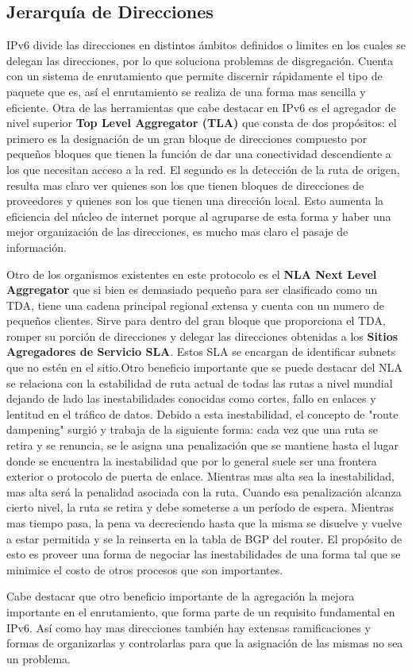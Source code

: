 \documentclass[11pt,a4paper]{article}
\begin{document}
\subsection{Jerarquía de Direcciones}
IPv6 divide las direcciones en distintos ámbitos definidos o limites en los cuales se delegan las 
direcciones, por lo que soluciona problemas de disgregación. Cuenta con un sistema de enrutamiento 
que permite discernir rápidamente el tipo de paquete que es, así el enrutamiento se realiza de una 
forma mas sencilla y eficiente.
Otra de las herramientas que cabe destacar en IPv6 es el agregador de nivel superior \textbf{Top 
Level Aggregator (TLA)} que consta de dos propósitos: el primero es la designación de un gran bloque 
de direcciones compuesto por pequeños bloques que tienen la función de dar una conectividad 
descendiente a los que necesitan acceso a la red. El segundo es la detección de la ruta de origen, 
resulta mas claro ver quienes son los que tienen bloques de direcciones de proveedores y quienes son 
los que tienen una dirección local. Esto aumenta la eficiencia del núcleo de internet porque al 
agruparse de esta forma y haber una mejor organización de las direcciones, es mucho mas claro el 
pasaje de información.\par
Otro de los organismos existentes en este protocolo es el \textbf{NLA Next Level Aggregator} que si 
bien es demasiado pequeño para ser clasificado como un TDA, tiene una cadena principal regional 
extensa y cuenta con un numero de pequeños clientes. Sirve para dentro del gran bloque que 
proporciona el TDA, romper su porción de direcciones y delegar las direcciones obtenidas a los 
\textbf{Sitios Agregadores de Servicio SLA}. Estos SLA se encargan de identificar subnets que no 
estén en el sitio.Otro beneficio importante que se puede destacar del NLA se relaciona con la 
estabilidad de ruta actual de todas las rutas a nivel mundial dejando de lado las inestabilidades 
conocidas como cortes, fallo en enlaces y lentitud en el tráfico de datos. Debido a esta 
inestabilidad, el concepto de "route dampening" surgió y trabaja de la siguiente forma: cada vez que 
una ruta se retira y se renuncia, se le asigna una penalización que se mantiene hasta el lugar donde 
se encuentra la inestabilidad que por lo general suele ser una frontera exterior o  protocolo de 
puerta de enlace. Mientras mas alta sea la inestabilidad, mas alta será la penalidad asociada con la 
ruta. Cuando esa penalización alcanza cierto nivel, la ruta se retira y debe someterse a un período 
de espera. Mientras mas tiempo pasa, la pena va decreciendo hasta que la misma se disuelve y vuelve 
a estar permitida y se la reinserta en la tabla  de BGP del router. El propósito de esto es proveer 
una forma de negociar las inestabilidades de una forma tal que se minimice el costo de otros 
procesos que son importantes.\par
Cabe destacar que otro beneficio importante de la agregación la mejora importante en el 
enrutamiento, que forma parte de un requisito fundamental en IPv6. Así como hay mas direcciones 
también hay extensas ramificaciones y formas de organizarlas y controlarlas para que la asignación 
de las mismas  no sea un problema.
\end{document}
